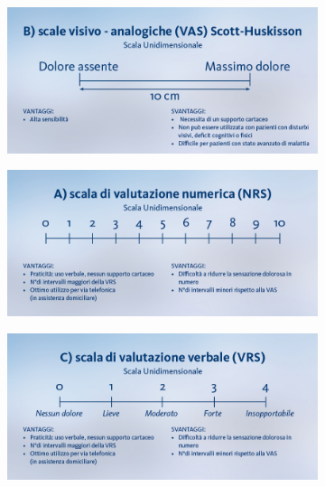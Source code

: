 \begin{figure}[H]
    \begin{subfigure}[b]{0.5\textwidth}
            \includegraphics[width=\linewidth]{img/VAS.jpeg}
            \caption{}
           
    \end{subfigure}
    \begin{subfigure}[b]{0.5\textwidth}
        \includegraphics[width=\linewidth]{img/NUMERICA.jpeg}
        \caption{}
        
\end{subfigure}
\begin{subfigure}[b]{0.5\textwidth}
    \includegraphics[width=\linewidth]{img/VERBALE.jpeg}
    \caption{}
    

\end{subfigure}
\end{figure}
